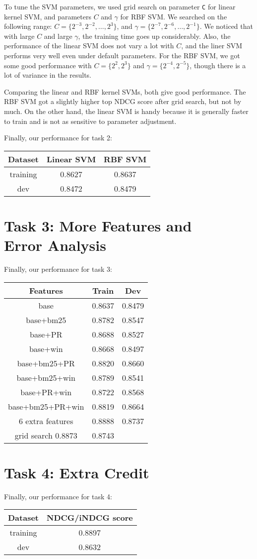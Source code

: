 \documentclass[10pt,twocolumn]{article}
\begin{document}
To tune the SVM parameters, we used grid search on parameter \texttt{C} for linear kernel SVM, and parameters $C$ and $\gamma$ for RBF SVM. We searched on the following range: $C=\{2^{-3},2^{-2},\dots,2^{3}\}$, and $\gamma=\{2^{-7},2^{-6},\dots,2^{-1}\}$. We noticed that with large $C$ and large $\gamma$, the training time goes up considerably. Also, the performance of the linear SVM does not vary a lot with $C$, and the liner SVM performs very well even under default parameters. For the RBF SVM, we got some good performance with $C=\{2^{2},2^{3}\}$ and $\gamma=\{2^{-4},2^{-5}\}$, though there is a lot of variance in the results.

Comparing the linear and RBF kernel SVMs, both give good performance. The RBF SVM got a slightly higher top NDCG score after grid search, but not by much. On the other hand, the linear SVM is handy because it is generally faster to train and is not as sensitive to parameter adjustment.

Finally, our performance for task 2:
\begin{table}[H]
\centering
\begin{tabular}{|c|c|c|}
\hline
Dataset & Linear SVM & RBF SVM \\\hline
training & 0.8627 & 0.8637 \\\hline
dev & 0.8472 & 0.8479\\\hline
\end{tabular}
\end{table}

\section*{Task 3: More Features and \\Error Analysis}
Finally, our performance for task 3:
\begin{table}[H]
\centering
\begin{tabular}{|c|c|c|}
\hline
Features &Train& Dev \\\hline
base & 0.8637 & 0.8479\\\hline
base+bm25 & 0.8782 & 0.8547\\\hline
base+PR & 0.8688 & 0.8527\\\hline
base+win & 0.8668 & 0.8497\\\hline
base+bm25+PR & 0.8820 & 0.8660\\\hline
base+bm25+win & 0.8789 & 0.8541\\\hline
base+PR+win & 0.8722 & 0.8568\\\hline
base+bm25+PR+win & 0.8819 & 0.8664\\\hline
6 extra features & 0.8888 & 0.8737\\\hline
grid search 0.8873 & 0.8743 & \\\hline
\end{tabular}
\end{table}

\section*{Task 4: Extra Credit}
Finally, our performance for task 4:
\begin{table}[H]
\centering
\begin{tabular}{|c|c|}
\hline
Dataset & NDCG/iNDCG score \\\hline
training & 0.8897\\\hline
dev & 0.8632\\\hline
\end{tabular}
\end{table}
\end{document}
